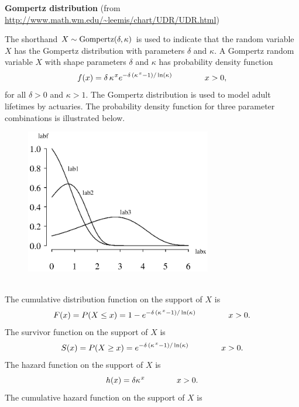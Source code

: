 \documentclass[12pt,fullpage]{article}
\begin{document}
\noindent
{\bf Gompertz distribution} (from \color{blue}\url{http://www.math.wm.edu/~leemis/chart/UDR/UDR.html}\color{black})

\noindent
The shorthand $X \sim {\rm Gompertz}(\delta, \kappa)$ is used to indicate that the
random variable $X$ has the Gompertz distribution with parameters $\delta$ and $\kappa$.
A Gompertz random variable $X$ with shape parameters $\delta$ and $\kappa$ has probability density function 
$$
f(x) = {\it \delta}\,{{\it \kappa}}^{\kern 0.08 em x}e^{-{\it \delta}\,
 \left(\kappa^{\kern 0.08 em x} - 1 \right)/\ln (\kappa)} \qquad \qquad x > 0,
$$
for all $\delta > 0$ and $\kappa > 1$.
The Gompertz distribution is used to model adult lifetimes by actuaries.
The probability density function for three parameter combinations is illustrated below.
{\begin{figure}[h!]
\begin{center}
\includegraphics[width=3.2in]{GompertzPlot.ps}
\end{center}
\end{figure}}\\
The cumulative distribution function on
the support of $X$ is
$$
F(x) = P(X \le x) = 1-e^{-{\it \delta}\,
 \left(\kappa^{\kern 0.08 em x} - 1 \right)/\ln (\kappa)}  \qquad \qquad x > 0.
$$
The survivor function on the support of $X$ is
$$
S(x) = P(X \ge x) = e^{-{\it \delta}\,
 \left(\kappa^{\kern 0.08 em x} - 1 \right)/\ln (\kappa)}  \qquad \qquad x > 0.
$$
The hazard function on the support of $X$ is
$$
h(x) = {\it \delta}{{\it \kappa}}^{\kern 0.08 em x} \qquad \qquad x > 0.
$$
The cumulative hazard function on the support of $X$ is 
\end{document}
